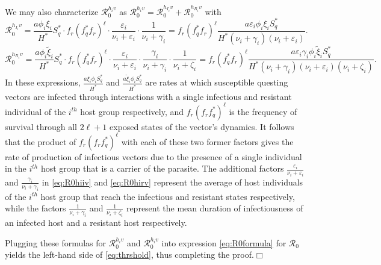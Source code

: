 \documentclass[a4paper]{article}
\newcommand{\edem}{\hfill $\Box$ }
\begin{document}
\noindent We may also characterize $\mathcal R_0^{h_iv}$ as $\mathcal R_0^{h_iv}= \mathcal R_0^{h_{I_i}v}+\mathcal R_0^{h_{R_i}v}$ with
\begin{equation}\label{eq:R0hiiv}
\mathcal R_0^{h_{I_i}v} = \frac{a\phi_i\xi_i}{H^*}S_q^* \cdot  f_r(f_q^* f_r)^{\ell} \cdot \frac{\varepsilon_i}{\nu_i + \varepsilon_i}  \cdot \frac{1}{\nu_i + \gamma_i} = f_r(f_q^* f_r)^{\ell}\frac{a\varepsilon_i\phi_i\xi_iS_q^*}{H^*(\nu_i + \gamma_i)(\nu_i + \varepsilon_i)}.  
\end{equation}
\begin{equation}\label{eq:R0hirv}
\mathcal R_0^{h_{R_i}v} = \frac{a\phi_i\widetilde\xi_i}{H^*}S_q^* \cdot  f_r(f_q^* f_r)^{\ell} \cdot \frac{\varepsilon_i}{\nu_i + \varepsilon_i}  \cdot \frac{\gamma_i}{\nu_i + \gamma_i} \cdot \frac{1}{\nu_i + \zeta_i} = f_r(f_q^* f_r)^{\ell}\frac{a\varepsilon_i\gamma_i\phi_i\widetilde\xi_iS_q^*}{H^*(\nu_i + \gamma_i)(\nu_i + \varepsilon_i)(\nu_i + \zeta_i)}.  
\end{equation}
In these expressions, $\frac{a\xi_i\phi_iS_q^*}{H^*}$ and $\frac{a\widetilde\xi_i\phi_iS_q^*}{H^*}$ are rates at which susceptible questing vectors are infected through interactions with a single infectious and resistant individual of the $i^{th}$ host group respectively, and  $f_r(f_rf_q^*)^\ell$ is the frequency of survival through all $2\ell+1$ exposed states of the vector's dynamics. It follows that the product of $f_r(f_rf_q^*)^\ell$ with each of these two former factors gives the rate of production of infectious vectors due to the presence of a single individual in the $i^{th}$ host group that is a carrier of the parasite. The additional factors $\frac{\varepsilon_i}{\nu_i+\varepsilon_i}$ and $\frac{\gamma_i}{\nu_i+\gamma_i}$ in \eqref{eq:R0hiiv} and \eqref{eq:R0hirv} represent the average of host individuals of the $i^{th}$ host group that reach the infectious and resistant states respectively, while the factors $\frac{1}{\nu_i+\gamma_i}$ and $\frac{1}{\nu_i+\zeta_i}$ represent the mean duration of infectiousness of an infected host and a resistant host respectively.

Plugging these formulas for $\mathcal R_0^{h_iv}$ and $\mathcal R_0^{h_iv}$ into expression \eqref{eq:R0formula}
for $\mathcal R_0$ yields the left-hand side of \eqref{eq:thrshold}, thus completing the proof.\edem 
\end{document}
